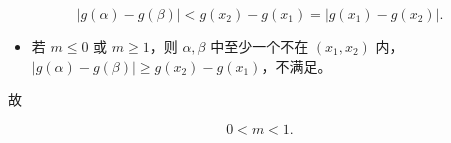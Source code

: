 \begin{answer}
\nopagebreak[4]
\[|g(\alpha)-g(\beta)|<g(x_2)-g(x_1)=|g(x_1)-g(x_2)|.\]

\begin{itemize}
\item 若 $m\leqslant0$ 或 $m\geqslant1$，则 $\alpha,\beta$ 中至少一个不在 $(x_1,x_2)$ 内，$|g(\alpha)-g(\beta)|\geqslant g(x_2)-g(x_1)$，不满足。
\end{itemize}

故

\nopagebreak[4]
\[0<m<1.\]


\end{answer}
